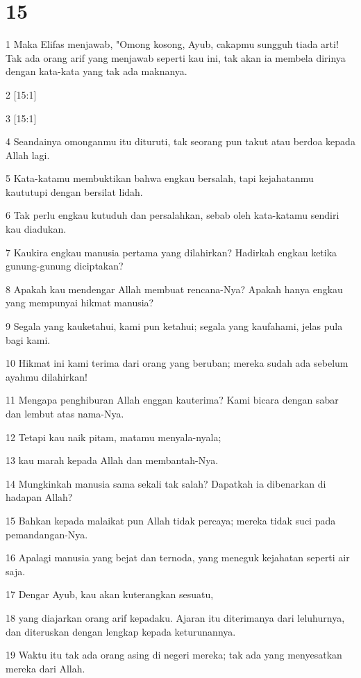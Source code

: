 \chapter{15}

\par 1 Maka Elifas menjawab, "Omong kosong, Ayub, cakapmu sungguh tiada arti! Tak ada orang arif yang menjawab seperti kau ini, tak akan ia membela dirinya dengan kata-kata yang tak ada maknanya.
\par 2 [15:1]
\par 3 [15:1]
\par 4 Seandainya omonganmu itu dituruti, tak seorang pun takut atau berdoa kepada Allah lagi.
\par 5 Kata-katamu membuktikan bahwa engkau bersalah, tapi kejahatanmu kaututupi dengan bersilat lidah.
\par 6 Tak perlu engkau kutuduh dan persalahkan, sebab oleh kata-katamu sendiri kau diadukan.
\par 7 Kaukira engkau manusia pertama yang dilahirkan? Hadirkah engkau ketika gunung-gunung diciptakan?
\par 8 Apakah kau mendengar Allah membuat rencana-Nya? Apakah hanya engkau yang mempunyai hikmat manusia?
\par 9 Segala yang kauketahui, kami pun ketahui; segala yang kaufahami, jelas pula bagi kami.
\par 10 Hikmat ini kami terima dari orang yang beruban; mereka sudah ada sebelum ayahmu dilahirkan!
\par 11 Mengapa penghiburan Allah enggan kauterima? Kami bicara dengan sabar dan lembut atas nama-Nya.
\par 12 Tetapi kau naik pitam, matamu menyala-nyala;
\par 13 kau marah kepada Allah dan membantah-Nya.
\par 14 Mungkinkah manusia sama sekali tak salah? Dapatkah ia dibenarkan di hadapan Allah?
\par 15 Bahkan kepada malaikat pun Allah tidak percaya; mereka tidak suci pada pemandangan-Nya.
\par 16 Apalagi manusia yang bejat dan ternoda, yang meneguk kejahatan seperti air saja.
\par 17 Dengar Ayub, kau akan kuterangkan sesuatu,
\par 18 yang diajarkan orang arif kepadaku. Ajaran itu diterimanya dari leluhurnya, dan diteruskan dengan lengkap kepada keturunannya.
\par 19 Waktu itu tak ada orang asing di negeri mereka; tak ada yang menyesatkan mereka dari Allah.
